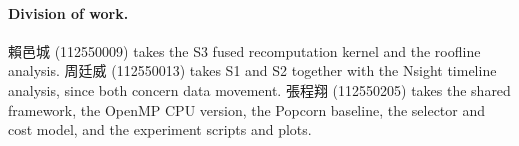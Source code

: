 \documentclass[sigconf]{acmart}
\begin{document}
\paragraph{Division of work.}
賴邑城 (112550009) takes the S3 fused recomputation kernel and the roofline
analysis. 周廷威 (112550013) takes S1 and S2 together with the Nsight timeline
analysis, since both concern data movement. 張程翔 (112550205) takes the shared
framework, the OpenMP CPU version, the Popcorn baseline, the selector and cost
model, and the experiment scripts and plots.



\end{document}
